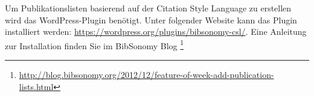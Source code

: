 Um Publikationslisten basierend auf der Citation Style Language zu erstellen wird das WordPress-Plugin benötigt. Unter folgender Website kann das Plugin installiert werden: \url{https://wordpress.org/plugins/bibsonomy-csl/}. Eine Anleitung zur Installation finden Sie im BibSonomy Blog \footnote{\url{http://blog.bibsonomy.org/2012/12/feature-of-week-add-publication-lists.html}}
